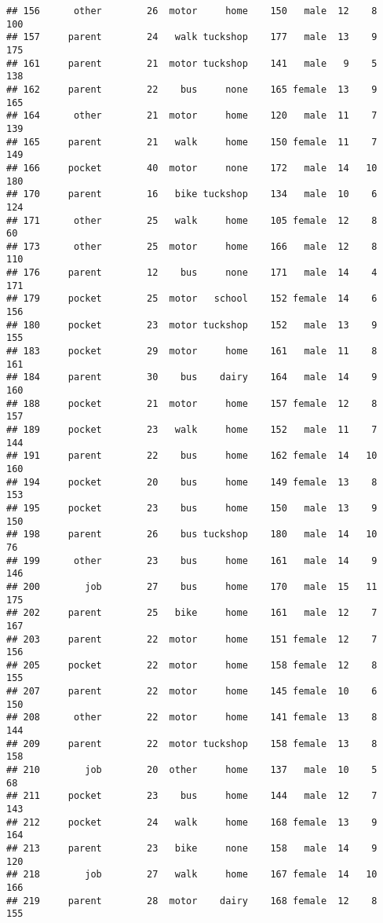 \documentclass[
]{article}
\begin{document}
\begin{verbatim}
## 156      other        26  motor     home    150   male  12    8     100
## 157     parent        24   walk tuckshop    177   male  13    9     175
## 161     parent        21  motor tuckshop    141   male   9    5     138
## 162     parent        22    bus     none    165 female  13    9     165
## 164      other        21  motor     home    120   male  11    7     139
## 165     parent        21   walk     home    150 female  11    7     149
## 166     pocket        40  motor     none    172   male  14   10     180
## 170     parent        16   bike tuckshop    134   male  10    6     124
## 171      other        25   walk     home    105 female  12    8      60
## 173      other        25  motor     home    166   male  12    8     110
## 176     parent        12    bus     none    171   male  14    4     171
## 179     pocket        25  motor   school    152 female  14    6     156
## 180     pocket        23  motor tuckshop    152   male  13    9     155
## 183     pocket        29  motor     home    161   male  11    8     161
## 184     parent        30    bus    dairy    164   male  14    9     160
## 188     pocket        21  motor     home    157 female  12    8     157
## 189     pocket        23   walk     home    152   male  11    7     144
## 191     parent        22    bus     home    162 female  14   10     160
## 194     pocket        20    bus     home    149 female  13    8     153
## 195     pocket        23    bus     home    150   male  13    9     150
## 198     parent        26    bus tuckshop    180   male  14   10      76
## 199      other        23    bus     home    161   male  14    9     146
## 200        job        27    bus     home    170   male  15   11     175
## 202     parent        25   bike     home    161   male  12    7     167
## 203     parent        22  motor     home    151 female  12    7     156
## 205     pocket        22  motor     home    158 female  12    8     155
## 207     parent        22  motor     home    145 female  10    6     150
## 208      other        22  motor     home    141 female  13    8     144
## 209     parent        22  motor tuckshop    158 female  13    8     158
## 210        job        20  other     home    137   male  10    5      68
## 211     pocket        23    bus     home    144   male  12    7     143
## 212     pocket        24   walk     home    168 female  13    9     164
## 213     parent        23   bike     none    158   male  14    9     120
## 218        job        27   walk     home    167 female  14   10     166
## 219     parent        28  motor    dairy    168 female  12    8     155

\end{verbatim}
\end{document}
